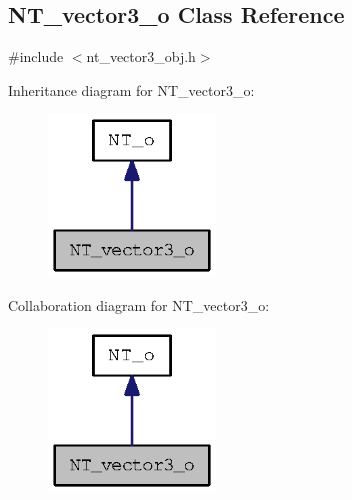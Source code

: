 \subsection{NT\_\-vector3\_\-o Class Reference}
\label{class_n_t__vector3__o}


{\ttfamily \#include $<$nt\_\-vector3\_\-obj.h$>$}



Inheritance diagram for NT\_\-vector3\_\-o:
\nopagebreak
\begin{figure}[H]
\begin{center}
\leavevmode
\includegraphics[width=126pt]{class_n_t__vector3__o__inherit__graph}
\end{center}
\end{figure}


Collaboration diagram for NT\_\-vector3\_\-o:
\nopagebreak
\begin{figure}[H]
\begin{center}
\leavevmode
\includegraphics[width=126pt]{class_n_t__vector3__o__coll__graph}
\end{center}
\end{figure}
